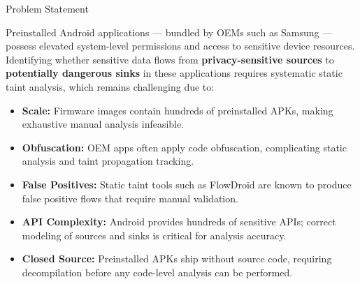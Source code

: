 \documentclass[aspectratio=169]{beamer}
\begin{document}
\begin{frame}{Problem Statement}

Preinstalled Android applications — bundled by OEMs such as Samsung —
possess elevated system-level permissions and access to sensitive device
resources. Identifying whether sensitive data flows from \textbf{privacy-sensitive
sources} to \textbf{potentially dangerous sinks} in these applications requires
systematic static taint analysis, which remains challenging due to:

\vspace{6pt}
\begin{itemize}
    \item \textbf{Scale:} Firmware images contain hundreds of preinstalled APKs,
          making exhaustive manual analysis infeasible.

    \item \textbf{Obfuscation:} OEM apps often apply code obfuscation, complicating
          static analysis and taint propagation tracking.

    \item \textbf{False Positives:} Static taint tools such as FlowDroid are known
          to produce false positive flows that require manual validation.

    \item \textbf{API Complexity:} Android provides hundreds of sensitive APIs;
          correct modeling of sources and sinks is critical for analysis accuracy.

    \item \textbf{Closed Source:} Preinstalled APKs ship without source code,
          requiring decompilation before any code-level analysis can be performed.
\end{itemize}
\end{frame}
\end{document}
